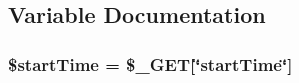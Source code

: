 \subsection{Variable Documentation}
\subsubsection[{\texorpdfstring{\$start\+Time}{$startTime}}]{\setlength{\rightskip}{0pt plus 5cm}\$start\+Time = \$\+\_\+\+G\+ET\mbox{[}\char`\"{}start\+Time\char`\"{}\mbox{]}}\hypertarget{getData_8php_a404df05d2efcd6bb0551ecd8e7ae2315}{}\label{getData_8php_a404df05d2efcd6bb0551ecd8e7ae2315}

